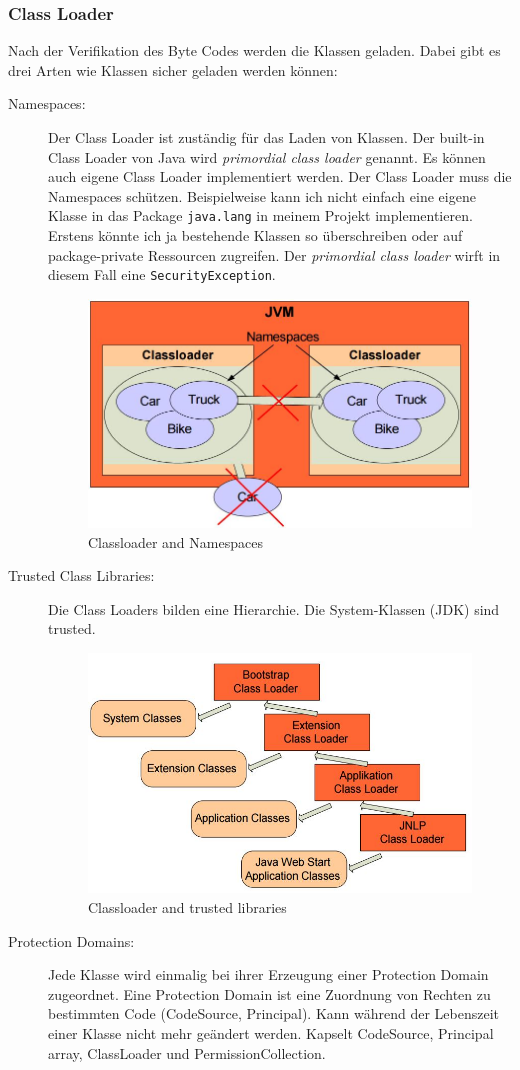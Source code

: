 \subsubsection{Class Loader}
Nach der Verifikation des Byte Codes werden die Klassen geladen. Dabei gibt es drei Arten wie Klassen sicher geladen werden können:
\begin{description}
	\item[Namespaces:] Der Class Loader ist zuständig für das Laden von Klassen. Der built-in Class Loader von Java wird \emph{primordial class loader} genannt. Es können auch eigene Class Loader implementiert werden. Der Class Loader muss die Namespaces schützen. Beispielweise kann ich nicht einfach eine eigene Klasse in das Package \verb|java.lang| in meinem Projekt implementieren. Erstens könnte ich ja bestehende Klassen so überschreiben oder auf package-private Ressourcen zugreifen. Der \emph{primordial class loader} wirft in diesem Fall eine \verb|SecurityException|.
	
	\begin{figure}[h!]
	\centering
	\includegraphics[width=0.7\linewidth]{fig/java-platform-namespaces}
	\caption{Classloader and Namespaces}
	\label{fig:java-platform-namespaces}
	\end{figure}

	\item[Trusted Class Libraries:] Die Class Loaders bilden eine Hierarchie. Die System-Klassen (JDK) sind trusted.
	\begin{figure}[h!]
	\centering
	\includegraphics[width=0.5\linewidth]{fig/java-classloader-trusted-libraries}
	\caption{Classloader and trusted libraries}
	\label{fig:java-classloader-trusted-libraries}
	\end{figure}

	\item[Protection Domains:] Jede Klasse wird einmalig bei ihrer Erzeugung einer Protection Domain zugeordnet. Eine Protection Domain ist eine Zuordnung von Rechten zu bestimmten Code (CodeSource, Principal). Kann während der Lebenszeit einer Klasse nicht mehr geändert werden. Kapselt CodeSource, Principal array, ClassLoader und PermissionCollection.
\end{description}

